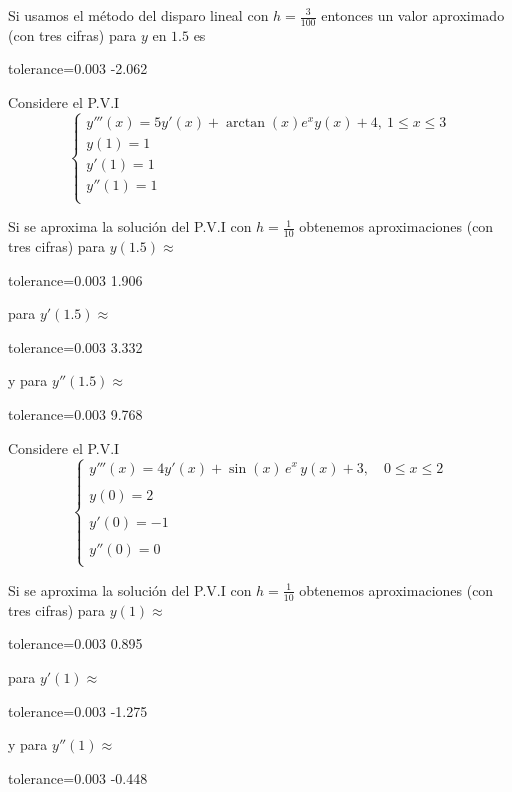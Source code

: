 \documentclass{article}
\begin{document}
\begin{quiz}{}
\begin{cloze}{}
\begin{numerical}[points=18]{}
    		Si usamos el m\'etodo del disparo lineal con $h=\frac{3}{100}$ entonces un valor aproximado (con tres cifras) para $y$ en $1.5$ es \item[tolerance=0.003] -2.062
    	\end{numerical}
    \end{cloze}
        \begin{cloze}{}
        	Considere el P.V.I
        	\[\begin{cases}
        		y'''(x) = 5y'(x) + \arctan(x)e^xy(x) + 4, \ 1\leq x \leq 3 \\
        		y(1) = 1 \\
        		y'(1) = 1 \\
        		y''(1) = 1 \\
        	\end{cases}\]
    \begin{numerical}[points=11]{}
    	Si se aproxima la soluci\'on del P.V.I con $h=\frac{1}{10}$ obtenemos aproximaciones (con tres cifras) para $y(1.5)\approx$\item[tolerance=0.003] 1.906
    \end{numerical}
    \begin{numerical}[points=11]{}
    	para $y'(1.5)\approx$\item[tolerance=0.003] 3.332
    \end{numerical}
    \begin{numerical}[points=11]{}
    	y para $y''(1.5) \approx$\item[tolerance=0.003] 9.768
    \end{numerical}
        \end{cloze}
    \begin{cloze}{}
    	Considere el P.V.I
    	\[
    	\begin{cases}
    		y'''(x) = 4y'(x) + \sin(x)\, e^x\, y(x) + 3, \quad 0 \leq x \leq 2 \\\\
    		y(0) = 2 \\\\
    		y'(0) = -1 \\\\
    		y''(0) = 0 \\
    	\end{cases}
    	\]
    	\begin{numerical}[points=11]{}
    		Si se aproxima la soluci\'on del P.V.I con $h=\frac{1}{10}$ obtenemos aproximaciones (con tres cifras) para $y(1)\approx$ \item[tolerance=0.003] 0.895
    	\end{numerical}
    	\begin{numerical}[points=11]{}
    		para $y'(1)\approx$ \item[tolerance=0.003] -1.275
    	\end{numerical}
    	\begin{numerical}[points=11]{}
    		y para $y''(1)\approx$ \item[tolerance=0.003] -0.448
    	\end{numerical}
    \end{cloze}
    \end{quiz}
\end{document}
